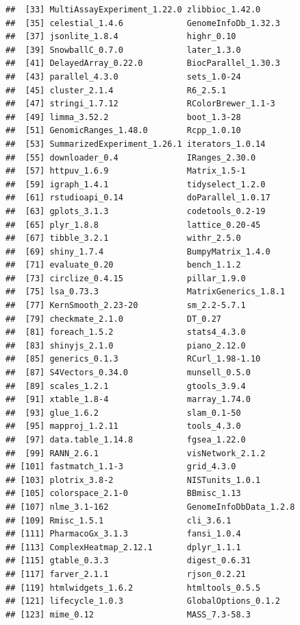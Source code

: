 \documentclass{article}\usepackage[]{graphicx}\usepackage[]{xcolor}
\makeatletter
\newenvironment{kframe}{%
 \def\at@end@of@kframe{}%
 \ifinner\ifhmode%
  \def\at@end@of@kframe{\end{minipage}}%
  \begin{minipage}{\columnwidth}%
 \fi\fi%
 \def\FrameCommand##1{\hskip\@totalleftmargin \hskip-\fboxsep
 \colorbox{shadecolor}{##1}\hskip-\fboxsep
     \hskip-\linewidth \hskip-\@totalleftmargin \hskip\columnwidth}%
 \MakeFramed {\advance\hsize-\width
   \@totalleftmargin\z@ \linewidth\hsize
   \@setminipage}}%
 {\par\unskip\endMakeFramed%
 \at@end@of@kframe}
\newenvironment{knitrout}{}{} %
\makeatother
\begin{document}
\begin{knitrout}
\begin{kframe}
\begin{verbatim}
##  [33] MultiAssayExperiment_1.22.0 zlibbioc_1.42.0            
##  [35] celestial_1.4.6             GenomeInfoDb_1.32.3        
##  [37] jsonlite_1.8.4              highr_0.10                 
##  [39] SnowballC_0.7.0             later_1.3.0                
##  [41] DelayedArray_0.22.0         BiocParallel_1.30.3        
##  [43] parallel_4.3.0              sets_1.0-24                
##  [45] cluster_2.1.4               R6_2.5.1                   
##  [47] stringi_1.7.12              RColorBrewer_1.1-3         
##  [49] limma_3.52.2                boot_1.3-28                
##  [51] GenomicRanges_1.48.0        Rcpp_1.0.10                
##  [53] SummarizedExperiment_1.26.1 iterators_1.0.14           
##  [55] downloader_0.4              IRanges_2.30.0             
##  [57] httpuv_1.6.9                Matrix_1.5-1               
##  [59] igraph_1.4.1                tidyselect_1.2.0           
##  [61] rstudioapi_0.14             doParallel_1.0.17          
##  [63] gplots_3.1.3                codetools_0.2-19           
##  [65] plyr_1.8.8                  lattice_0.20-45            
##  [67] tibble_3.2.1                withr_2.5.0                
##  [69] shiny_1.7.4                 BumpyMatrix_1.4.0          
##  [71] evaluate_0.20               bench_1.1.2                
##  [73] circlize_0.4.15             pillar_1.9.0               
##  [75] lsa_0.73.3                  MatrixGenerics_1.8.1       
##  [77] KernSmooth_2.23-20          sm_2.2-5.7.1               
##  [79] checkmate_2.1.0             DT_0.27                    
##  [81] foreach_1.5.2               stats4_4.3.0               
##  [83] shinyjs_2.1.0               piano_2.12.0               
##  [85] generics_0.1.3              RCurl_1.98-1.10            
##  [87] S4Vectors_0.34.0            munsell_0.5.0              
##  [89] scales_1.2.1                gtools_3.9.4               
##  [91] xtable_1.8-4                marray_1.74.0              
##  [93] glue_1.6.2                  slam_0.1-50                
##  [95] mapproj_1.2.11              tools_4.3.0                
##  [97] data.table_1.14.8           fgsea_1.22.0               
##  [99] RANN_2.6.1                  visNetwork_2.1.2           
## [101] fastmatch_1.1-3             grid_4.3.0                 
## [103] plotrix_3.8-2               NISTunits_1.0.1            
## [105] colorspace_2.1-0            BBmisc_1.13                
## [107] nlme_3.1-162                GenomeInfoDbData_1.2.8     
## [109] Rmisc_1.5.1                 cli_3.6.1                  
## [111] PharmacoGx_3.1.3            fansi_1.0.4                
## [113] ComplexHeatmap_2.12.1       dplyr_1.1.1                
## [115] gtable_0.3.3                digest_0.6.31              
## [117] farver_2.1.1                rjson_0.2.21               
## [119] htmlwidgets_1.6.2           htmltools_0.5.5            
## [121] lifecycle_1.0.3             GlobalOptions_0.1.2        
## [123] mime_0.12                   MASS_7.3-58.3
\end{verbatim}
\end{kframe}
\end{knitrout}
\end{document}
